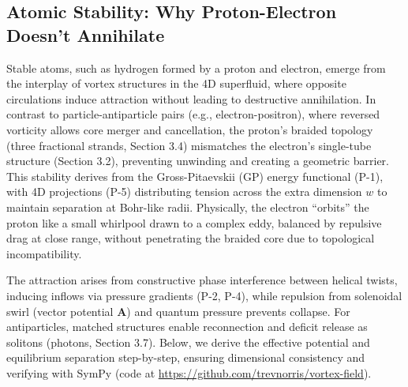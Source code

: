 
\subsection{Atomic Stability: Why Proton-Electron Doesn't Annihilate}

Stable atoms, such as hydrogen formed by a proton and electron, emerge from the interplay of vortex structures in the 4D superfluid, where opposite circulations induce attraction without leading to destructive annihilation. In contrast to particle-antiparticle pairs (e.g., electron-positron), where reversed vorticity allows core merger and cancellation, the proton's braided topology (three fractional strands, Section 3.4) mismatches the electron's single-tube structure (Section 3.2), preventing unwinding and creating a geometric barrier. This stability derives from the Gross-Pitaevskii (GP) energy functional (P-1), with 4D projections (P-5) distributing tension across the extra dimension $w$ to maintain separation at Bohr-like radii. Physically, the electron ``orbits'' the proton like a small whirlpool drawn to a complex eddy, balanced by repulsive drag at close range, without penetrating the braided core due to topological incompatibility.

The attraction arises from constructive phase interference between helical twists, inducing inflows via pressure gradients (P-2, P-4), while repulsion from solenoidal swirl (vector potential $\mathbf{A}$) and quantum pressure prevents collapse. For antiparticles, matched structures enable reconnection and deficit release as solitons (photons, Section 3.7). Below, we derive the effective potential and equilibrium separation step-by-step, ensuring dimensional consistency and verifying with SymPy (code at \url{https://github.com/trevnorris/vortex-field}).

